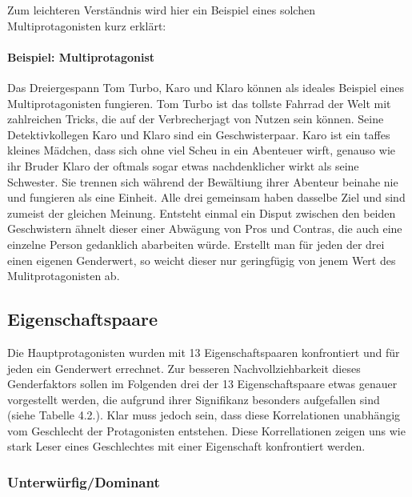 

Zum leichteren Verständnis wird hier ein Beispiel eines solchen
Multiprotagonisten kurz erklärt:

\paragraph{Beispiel: Multiprotagonist}

Das Dreiergespann Tom Turbo, Karo und Klaro können als ideales Beispiel
eines Multiprotagonisten fungieren. Tom Turbo ist das tollste Fahrrad
der Welt mit zahlreichen Tricks, die auf der Verbrecherjagt von Nutzen
sein können. Seine Detektivkollegen Karo und Klaro sind ein
Geschwisterpaar. Karo ist ein taffes kleines Mädchen, dass sich ohne
viel Scheu in ein Abenteuer wirft, genauso wie ihr Bruder Klaro der
oftmals sogar etwas nachdenklicher wirkt als seine Schwester. Sie
trennen sich während der Bewältiung ihrer Abenteur beinahe nie und
fungieren als eine Einheit. Alle drei gemeinsam haben dasselbe Ziel und
sind zumeist der gleichen Meinung. Entsteht einmal ein Disput zwischen
den beiden Geschwistern ähnelt dieser einer Abwägung von Pros und
Contras, die auch eine einzelne Person gedanklich abarbeiten würde.
\parencite{brezina2000} Erstellt man für jeden der drei einen eigenen
Genderwert, so weicht dieser nur geringfügig von jenem Wert des
Mulitprotagonisten ab.

\subsection{Eigenschaftspaare}

Die Hauptprotagonisten wurden mit 13 Eigenschaftspaaren konfrontiert und
für jeden ein Genderwert errechnet. Zur besseren Nachvollziehbarkeit
dieses Genderfaktors sollen im Folgenden drei der 13 Eigenschaftspaare
etwas genauer vorgestellt werden, die aufgrund ihrer Signifikanz
besonders aufgefallen sind (siehe Tabelle 4.2.). Klar muss jedoch sein,
dass diese Korrelationen unabhängig vom Geschlecht der Protagonisten
entstehen. Diese Korrellationen zeigen uns wie stark Leser eines
Geschlechtes mit einer Eigenschaft konfrontiert werden.



\subsubsection{Unterwürfig/Dominant}

